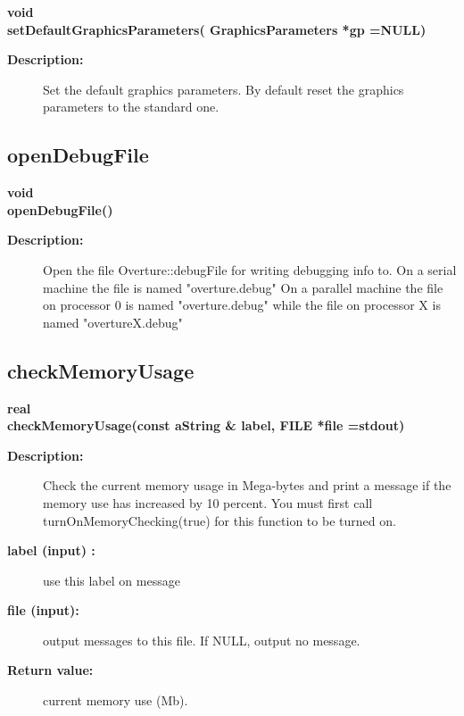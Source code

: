 \begin{flushleft} \textbf{%
void  \\ 
\settowidth{\OvertureIncludeArgIndent}{setDefaultGraphicsParameters(}%
setDefaultGraphicsParameters( GraphicsParameters *gp  =NULL)
}\end{flushleft}
\begin{description}
\item[{\bf Description:}] 
   Set the default graphics parameters. By default reset the graphics parameters to
 the standard one.

\end{description}
\subsection{openDebugFile}
 
\begin{flushleft} \textbf{%
void  \\ 
\settowidth{\OvertureIncludeArgIndent}{openDebugFile(}%
openDebugFile()
}\end{flushleft}
\begin{description}
\item[{\bf Description:}] 
    Open the file Overture::debugFile for writing debugging info to.
  On a serial machine the file is named "overture.debug"
  On a parallel machine the file on processor 0 is named "overture.debug"
  while the file on processor X is named "overtureX.debug"
\end{description}
\subsection{checkMemoryUsage}
 
\begin{flushleft} \textbf{%
real  \\ 
\settowidth{\OvertureIncludeArgIndent}{checkMemoryUsage(}%
checkMemoryUsage(const aString \& label, FILE *file  =stdout)
}\end{flushleft}
\begin{description}
\item[{\bf Description:}] 
   Check the current memory usage in Mega-bytes and print a message if the memory use
  has increased by 10 percent. You must first call turnOnMemoryChecking(true) for this
  function to be turned on.

\item[{\bf label (input) :}]  use this label on message
\item[{\bf file (input):}]  output messages to this file. If NULL, output no message.
\item[{\bf Return value:}]  current memory use (Mb).
 
\end{description}

